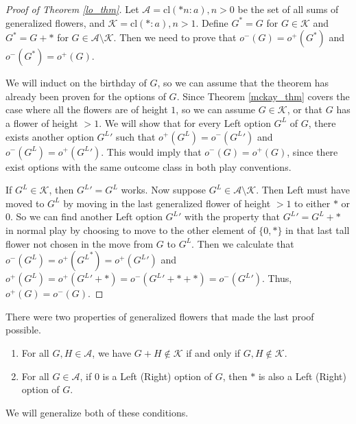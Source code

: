 \documentclass{amsart}
\theoremstyle{plain}
\theoremstyle{definition}
\theoremstyle{remark}
\numberwithin{equation}{section}
\numberwithin{thm}{section}
\begin{document}
\begin{proof}[Proof of Theorem \ref{lo_thm}]
     Let $\mathscr{A} = \text{cl}(*n:a), n > 0$ be the set of all sums of generalized flowers, and $\mathscr{K} = \text{cl}(*:a), n > 1$. Define $G^* = G$ for $G \in \mathscr{K}$ and $G^* = G+*$ for $G \in \mathscr{A}\setminus \mathscr{K}$. Then we need to prove that $o^-(G) = o^+(G^*)$ and $o^-(G^*)=o^+(G)$.
    
We will induct on the birthday of $G$, so we can assume that the theorem has already been proven for the options of $G$.  Since  Theorem \ref{mckay_thm} covers the case where all the flowers are of height $1$, so we can assume $G \in \mathscr{K}$, or that $G$ has a flower of height $>1$. We will show that for every Left option $G^L$ of $G$, there exists another option ${G^{L}}'$ such that $o^+(G^L) = o^-({G^L}')$ and $o^-(G^L) = o^+({G^L}')$. This would imply that $o^-(G) = o^+(G)$, since there exist options with the same outcome class in both play conventions.

If $G^{L} \in \mathscr{K}$, then ${G^{L}}'= G^L$ works. Now suppose $G^{L} \in \mathscr{A}\setminus\mathscr{K}$. Then Left must have moved to $G^L$ by moving in the last generalized flower of height $>1$ to either $*$ or $0$. So we can find another Left option ${G^{L}}'$ with the property that $  {G^L}'=G^{L}+* $ in normal play by choosing to move to the other element of $\{0,*\}$ in that last tall flower not chosen in the move from $G$ to $G^L$. Then we calculate that $o^-(G^L) = o^+({G^L}^*) = o^+ ({G^L}')$ and $o^+(G^L) = o^+({G^L}' +*) = o^- ({G^L}' +*+*) = o^-({G^L}')$. Thus, $o^+(G) = o^-(G)$.
 \end{proof}
There were two properties of generalized flowers that made the last proof possible. 
\begin{enumerate}
    \item For all $G,H  \in \mathscr{A}$, we have $G+H \notin \mathscr{K}$ if and only if $G,H \notin \mathscr{K}$.
    \item For all $G \in \mathscr{A}$, if $0$ is a Left (Right) option of $G$, then $*$ is also a Left (Right) option of $G$.
 \end{enumerate}
We will generalize both of these conditions.
\end{document}
